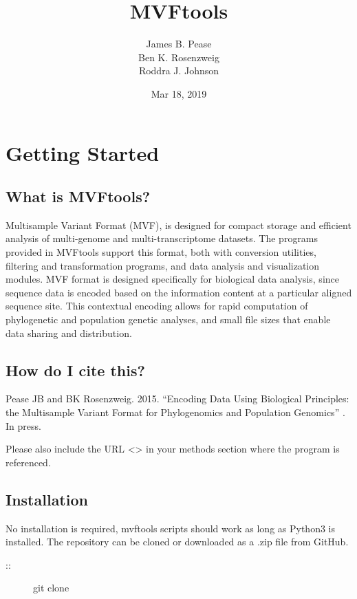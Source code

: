 \documentclass[letterpaper,11pt,english]{sphinxmanual}
\title{MVFtools}
\date{Mar 18, 2019}
\author{James B. Pease\\Ben K. Rosenzweig\\Roddra J. Johnson}
\begin{document}
\maketitle
\sphinxtableofcontents
{}\label{\detokenize{index::doc}}



\chapter{Getting Started}
\label{\detokenize{intro::doc}}\label{\detokenize{intro:getting-started}}\label{\detokenize{intro:intro}}\label{\detokenize{intro:welcome-to-mvftools-s-documentation}}

\section{What is MVFtools?}
\label{\detokenize{intro:what-is-mvftools}}
Multisample Variant Format (MVF), is designed for compact storage and efficient analysis of multi-genome and multi-transcriptome datasets.  The programs provided in MVFtools support this format, both with conversion utilities, filtering and transformation programs, and data analysis and visualization modules.  MVF format is designed specifically for biological data analysis, since sequence data is encoded based on the information content at a particular aligned sequence site.  This contextual encoding allows for rapid computation of phylogenetic and population genetic analyses, and small file sizes that enable data sharing and distribution.


\section{How do I cite this?}
\label{\detokenize{intro:how-do-i-cite-this}}
Pease JB and BK Rosenzweig. 2015. “Encoding Data Using Biological Principles: the Multisample Variant Format for Phylogenomics and Population Genomics” . In press. 

Please also include the URL \textless{}\textgreater{} in your methods section where the program is referenced.


\section{Installation}
\label{\detokenize{intro:installation}}
No installation is required, mvftools scripts should work as long as Python3 is installed.  The repository can be cloned or downloaded as a .zip file from GitHub.
\begin{description}
\item[{::}] \leavevmode
git clone 

\end{description}
\end{document}
